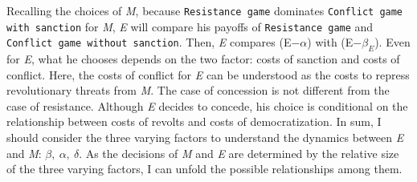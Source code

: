 \documentclass[11pt]{article}
\begin{document}
Recalling the choices of \textit{M}, because \texttt{Resistance game} dominates \texttt{Conflict game with sanction} for \textit{M}, \textit{E} will compare his payoffs of \texttt{Resistance game} and \texttt{Conflict game without sanction}. Then, \textit{E} compares (E$-\alpha$) with (E$-\beta_{E}$). Even for \textit{E}, what he chooses depends on the two factor: costs of sanction and costs of conflict. Here, the costs of conflict for \textit{E} can be understood as the costs to repress revolutionary threats from \textit{M}. The case of concession is not different from the case of resistance. Although \textit{E} decides to concede, his choice is conditional on the relationship between costs of revolts and costs of democratization. In sum, I should consider the three varying factors to understand the dynamics between \textit{E} and \textit{M}: $\beta, \: \alpha, \: \delta$. As the decisions of \textit{M} and \textit{E} are determined by the relative size of the three varying factors, I can unfold the possible relationships among them.
\end{document}
